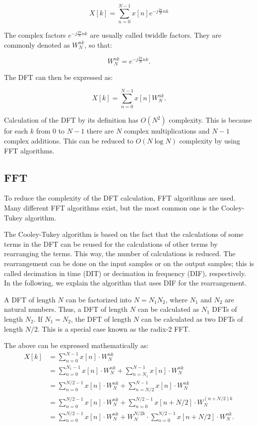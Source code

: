\documentclass[a4paper,12pt, master]{etf}
\begin{document}
\begin{equation}
    X[k] = \sum_{n=0}^{N-1} x[n] e^{-j \frac{2\pi}{N} n k}
\label{dft_formula}
\end{equation}

The complex factors $e^{-j \frac{2\pi}{N} n k}$ are usually called twiddle factors. They are commonly denoted as $W_N^{nk}$, so that:

\begin{equation}
    W_N^{nk} = e^{-j \frac{2\pi}{N} n k}.
\label{twiddle_factor_formula}
\end{equation}

The DFT can then be expressed as:

\begin{equation}
    X[k] = \sum_{n=0}^{N-1} x[n] W_N^{nk}.
\label{dft_formula_2}
\end{equation}

Calculation of the DFT by its definition has $O(N^2)$ complexity. This is because for each $k$ from $0$ to $N-1$ there are $N$ complex multiplications and $N-1$ complex additions. This can be reduced to $O(N \log N)$ complexity by using FFT algorithms.

\subsection{FFT}
To reduce the complexity of the DFT calculation, FFT algorithms are used. Many different FFT algorithms exist, but the most common one is the Cooley-Tukey algorithm.

The Cooley-Tukey algorithm is based on the fact that the calculations of some terms in the DFT can be reused for the calculations of other terms by rearranging the terms. This way, the number of calculations is reduced.
The rearrangement can be done on the input samples or on the output samples; this is called decimation in time (DIT) or decimation in frequency (DIF), respectively. In the following, we explain the algorithm that uses DIF for the rearrangement.

A DFT of length $N$ can be factorized into $N = N_1 N_2$, where $N_1$ and $N_2$ are natural numbers. Thus, a DFT of length $N$ can be calculated as $N_1$ DFTs of length $N_2$. If $N_1 = N_2$, the DFT of length $N$ can be calculated as two DFTs of length $N/2$. This is a special case known as the radix-2 FFT.

The above can be expressed mathematically as:
\begin{equation}
\begin{split}
    X[k] &= \sum_{n=0}^{N-1} x[n] \cdot W_N^{nk} \\
    &= \sum_{n=0}^{N_1-1} x[n] \cdot W_N^{nk} + \sum_{n=N_1}^{N-1} x[n] \cdot W_N^{nk} \\
    &= \sum_{n=0}^{N/2-1} x[n] \cdot W_N^{nk} + \sum_{n=N/2}^{N-1} x[n] \cdot W_N^{nk} \\
    &= \sum_{n=0}^{N/2-1} x[n] \cdot W_N^{nk} + \sum_{n=0}^{N/2-1} x[n + N/2] \cdot W_N^{(n + N/2)k} \\
    &= \sum_{n=0}^{N/2-1} x[n] \cdot W_N^{nk} + W_N^{N/2k}\cdot\sum_{n=0}^{N/2-1} x[n + N/2] \cdot W_N^{nk}.
\label{dft_radix2_0}
\end{split}
\end{equation}
\end{document}
